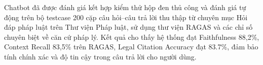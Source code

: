 \documentclass[../DoAn.tex]{subfiles}
\begin{document}
Chatbot đã được đánh giá kết hợp kiểm thử hộp đen thủ công và đánh giá tự động trên bộ testcase 200 cặp câu hỏi--câu trả lời thu thập từ chuyên mục Hỏi đáp pháp luật trên Thư viện Pháp luật, sử dụng thư viện RAGAS và các chỉ số chuyên biệt về căn cứ pháp lý. Kết quả cho thấy hệ thống đạt Faithfulness 88,2\%, Context Recall 83,5\% trên RAGAS, Legal Citation Accuracy đạt 83.7\%, đảm bảo tính chính xác và độ tin cậy trong câu trả lời cho người dùng.


\end{document}
